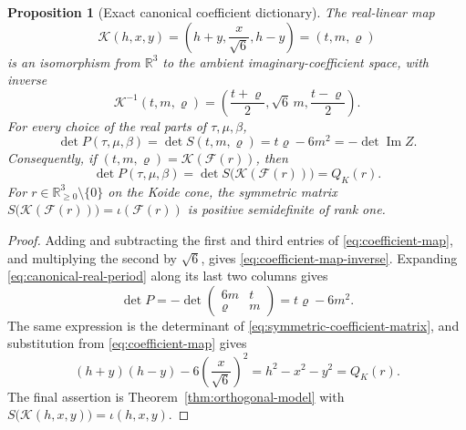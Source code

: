 \documentclass[11pt]{article}
\numberwithin{equation}{section}
\newtheorem{proposition}[theorem]{Proposition}
\theoremstyle{definition}
\theoremstyle{remark}
\newcommand{\R}{\mathbb R}
\begin{document}
\begin{proposition}[Exact canonical coefficient dictionary]
\label{prop:S6-dictionary}
The real-linear map
\begin{equation}\label{eq:coefficient-map}
 \mathcal K(h,x,y)
 =\left(h+y,\frac{x}{\sqrt6},h-y\right)=(t,m,\varrho)
\end{equation}
is an isomorphism from $\R^3$ to the ambient imaginary-coefficient space,
with inverse
\begin{equation}\label{eq:coefficient-map-inverse}
 \mathcal K^{-1}(t,m,\varrho)
 =\left(\frac{t+\varrho}{2},\sqrt6\,m,
        \frac{t-\varrho}{2}\right).
\end{equation}
For every choice of the real parts of $\tau,\mu,\beta$,
\begin{equation}\label{eq:canonical-discriminant}
 \det P(\tau,\mu,\beta)
 =\det S(t,m,\varrho)
 =t\varrho-6m^2
 =-\det\operatorname{Im}Z.
\end{equation}
Consequently, if $(t,m,\varrho)=\mathcal K(\mathcal F(r))$, then
\begin{equation}\label{eq:period-koide-identity}
 \det P(\tau,\mu,\beta)
 =\det S\bigl(\mathcal K(\mathcal F(r))\bigr)
 =Q_K(r).
\end{equation}
For $r\in\R_{\geq0}^3\setminus\{0\}$ on the Koide cone, the symmetric
matrix $S\bigl(\mathcal K(\mathcal F(r))\bigr)=\iota(\mathcal F(r))$ is
positive semidefinite of rank one.
\end{proposition}

\begin{proof}
Adding and subtracting the first and third entries of
\eqref{eq:coefficient-map}, and multiplying the second by $\sqrt6$, gives
\eqref{eq:coefficient-map-inverse}.  Expanding
\eqref{eq:canonical-real-period} along its last two columns gives
\[
 \det P
 =-\det\begin{pmatrix}6m&t\\ \varrho&m\end{pmatrix}
 =t\varrho-6m^2.
\]
The same expression is the determinant of
\eqref{eq:symmetric-coefficient-matrix}, and substitution from
\eqref{eq:coefficient-map} gives
\[
 (h+y)(h-y)-6\left(\frac{x}{\sqrt6}\right)^2
 =h^2-x^2-y^2=Q_K(r).
\]
The final assertion is Theorem~\ref{thm:orthogonal-model} with
$S\bigl(\mathcal K(h,x,y)\bigr)=\iota(h,x,y)$.
\end{proof}
\end{document}
